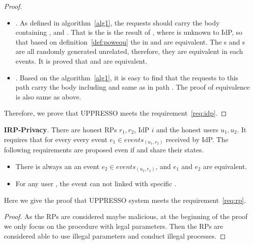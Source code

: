 \begin{appendices}
\begin{proof}
\begin{itemize}
\item {}. As defined in algorithm~\ref{alg1}, the requests should carry the body containing ,  and . That is the  is the result of , where  is unknown to IdP, so that based on definition~\ref{def:powequ} the  in  and  are equivalent. The s and s are all randomly generated unrelated, therefore, they are equivalent in each events. It is proved that  and  are equivalent. 
\item {}. Based on the algorithm~\ref{alg1}, it is easy to find that the requests to this path carry the body including  and  same as in path . The proof of equivalence is also same as above.
\end{itemize}
Therefore, we prove that UPPRESSO meets the requirement~\ref{req:idp}.
\end{proof}

\begin{req}
\textbf{IRP-Privacy}. There are honest RPs $r_1, r_2$, IdP $i$ and the honest users $u_1, u_2$. It requires that for every every event $e_1 \in events_{(u_1, r_2)}$ received by IdP. The following requirements are proposed even if  and  share their states.
\begin{itemize}
\item There is always an  an event $e_2 \in events_{(u_2, r_2)}$, and $e_1$ and $e_2$ are equivalent.
\item For any user , the event  can not linked with specific  .
\end{itemize}
\label{req:rp}
\end{req}
Here we give the proof that UPPRESSO system meets the requirement~\ref{req:rp}.
\begin{proof}
As the RPs are considered maybe malicious, at the beginning of the proof we only focus on the procedure with legal parameters. Then the RPs are considered able to use illegal parameters and conduct illegal processes. 


\end{proof}
\end{appendices}
